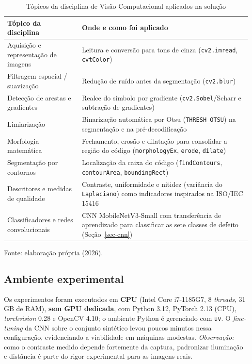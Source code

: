 \documentclass[
	article,			%
	11pt,				%
	oneside,			%
	a4paper,			%
	english,			%
	brazilian,			%
	sumario=tradicional
	]{abntex2}
\begin{document}
\begin{table}[htb]
\centering
\caption{Tópicos da disciplina de Visão Computacional aplicados na solução}
\label{tab-disciplina}
\begin{tabular}{@{}p{5.0cm}p{8.0cm}@{}}
\toprule
\textbf{Tópico da disciplina} & \textbf{Onde e como foi aplicado}\\
\midrule
Aquisição e representação de imagens & Leitura e conversão para tons de cinza
(\texttt{cv2.imread}, \texttt{cvtColor})\\
Filtragem espacial / suavização & Redução de ruído antes da segmentação
(\texttt{cv2.blur})\\
Detecção de arestas e gradientes & Realce do símbolo por gradiente
(\texttt{cv2.Sobel}/Scharr e subtração de gradientes)\\
Limiarização & Binarização automática por Otsu (\texttt{THRESH\_OTSU}) na segmentação
e na pré-decodificação\\
Morfologia matemática & Fechamento, erosão e dilatação para consolidar a região do
código (\texttt{morphologyEx}, \texttt{erode}, \texttt{dilate})\\
Segmentação por contornos & Localização da caixa do código (\texttt{findContours},
\texttt{contourArea}, \texttt{boundingRect})\\
Descritores e medidas de qualidade & Contraste, uniformidade e nitidez (variância do
\texttt{Laplaciano}) como indicadores inspirados na ISO/IEC 15416\\
Classificadores e redes convolucionais & CNN MobileNetV3-Small com transferência de
aprendizado para classificar as sete classes de defeito (Seção~\ref{sec-cnn})\\
\bottomrule
\end{tabular}

\vspace{2pt}
{\footnotesize Fonte: elaboração própria (2026).}
\end{table}

\subsection{Ambiente experimental}

Os experimentos foram executados em \textbf{CPU} (Intel Core i7-1185G7, 8
\textit{threads}, 31\,GB de RAM), \textbf{sem GPU dedicada}, com Python 3.12, PyTorch
2.13 (CPU), \textit{torchvision} 0.28 e OpenCV 4.10; o ambiente Python é gerenciado com
\texttt{uv}. O \textit{fine-tuning} da CNN sobre o conjunto sintético levou poucos
minutos nessa configuração, evidenciando a viabilidade em máquinas modestas.
\textit{Observação:} como o contraste medido depende fortemente da captura, padronizar
iluminação e distância é parte do rigor experimental para as imagens reais.
\end{document}
